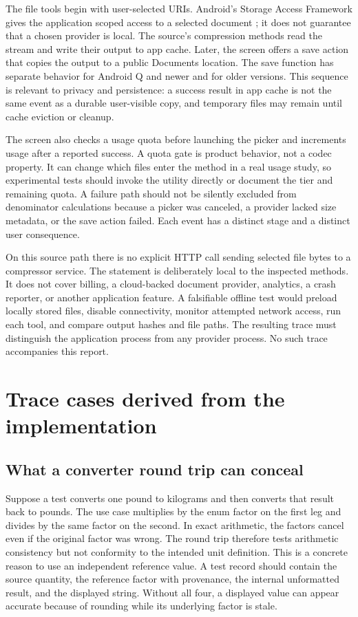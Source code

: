 \documentclass[10pt,letterpaper]{article}
\begin{document}
The file tools begin with user-selected URIs. Android's Storage Access Framework gives the application scoped access to a selected document \cite{androidpicker}; it does not guarantee that a chosen provider is local. The source's compression methods read the stream and write their output to app cache. Later, the screen offers a save action that copies the output to a public Documents location. The save function has separate behavior for Android Q and newer and for older versions. This sequence is relevant to privacy and persistence: a success result in app cache is not the same event as a durable user-visible copy, and temporary files may remain until cache eviction or cleanup.

The screen also checks a usage quota before launching the picker and increments usage after a reported success. A quota gate is product behavior, not a codec property. It can change which files enter the method in a real usage study, so experimental tests should invoke the utility directly or document the tier and remaining quota. A failure path should not be silently excluded from denominator calculations because a picker was canceled, a provider lacked size metadata, or the save action failed. Each event has a distinct stage and a distinct user consequence.

On this source path there is no explicit HTTP call sending selected file bytes to a compressor service. The statement is deliberately local to the inspected methods. It does not cover billing, a cloud-backed document provider, analytics, a crash reporter, or another application feature. A falsifiable offline test would preload locally stored files, disable connectivity, monitor attempted network access, run each tool, and compare output hashes and file paths. The resulting trace must distinguish the application process from any provider process. No such trace accompanies this report.

\section{Trace cases derived from the implementation}

\subsection{What a converter round trip can conceal}

Suppose a test converts one pound to kilograms and then converts that result back to pounds. The use case multiplies by the enum factor on the first leg and divides by the same factor on the second. In exact arithmetic, the factors cancel even if the original factor was wrong. The round trip therefore tests arithmetic consistency but not conformity to the intended unit definition. This is a concrete reason to use an independent reference value. A test record should contain the source quantity, the reference factor with provenance, the internal unformatted result, and the displayed string. Without all four, a displayed value can appear accurate because of rounding while its underlying factor is stale.
\end{document}
